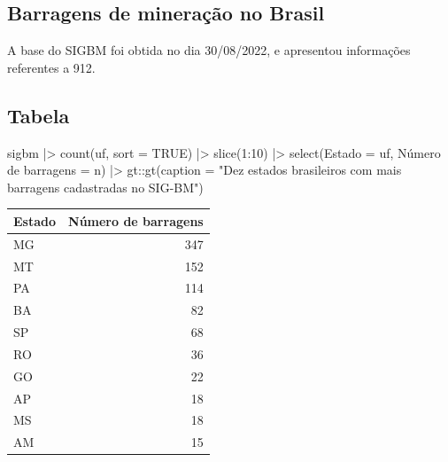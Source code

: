 \documentclass[
  letterpaper,
  DIV=11,
  numbers=noendperiod]{scrartcl}
\newenvironment{Shaded}{\begin{snugshade}}{\end{snugshade}}
\newcommand{\AttributeTok}[1]{\textcolor[rgb]{0.40,0.45,0.13}{#1}}
\newcommand{\ConstantTok}[1]{\textcolor[rgb]{0.56,0.35,0.01}{#1}}
\newcommand{\DecValTok}[1]{\textcolor[rgb]{0.68,0.00,0.00}{#1}}
\newcommand{\FunctionTok}[1]{\textcolor[rgb]{0.28,0.35,0.67}{#1}}
\newcommand{\NormalTok}[1]{\textcolor[rgb]{0.00,0.23,0.31}{#1}}
\newcommand{\OtherTok}[1]{\textcolor[rgb]{0.00,0.23,0.31}{#1}}
\newcommand{\SpecialCharTok}[1]{\textcolor[rgb]{0.37,0.37,0.37}{#1}}
\newcommand{\StringTok}[1]{\textcolor[rgb]{0.13,0.47,0.30}{#1}}
\begin{document}
\hypertarget{barragens-de-minerauxe7uxe3o-no-brasil}{%
\subsection{Barragens de mineração no
Brasil}\label{barragens-de-minerauxe7uxe3o-no-brasil}}

A base do SIGBM foi obtida no dia 30/08/2022, e apresentou informações
referentes a 912.

\hypertarget{tabela}{%
\subsection{Tabela}\label{tabela}}

\begin{Shaded}
\begin{Highlighting}[]
\NormalTok{sigbm }\SpecialCharTok{|\textgreater{}}
  \FunctionTok{count}\NormalTok{(uf, }\AttributeTok{sort =} \ConstantTok{TRUE}\NormalTok{) }\SpecialCharTok{|\textgreater{}}
  \FunctionTok{slice}\NormalTok{(}\DecValTok{1}\SpecialCharTok{:}\DecValTok{10}\NormalTok{) }\SpecialCharTok{|\textgreater{}}
  \FunctionTok{select}\NormalTok{(}\StringTok{\textasciigrave{}}\AttributeTok{Estado}\StringTok{\textasciigrave{}} \OtherTok{=}\NormalTok{ uf, }\StringTok{\textasciigrave{}}\AttributeTok{Número de barragens}\StringTok{\textasciigrave{}} \OtherTok{=}\NormalTok{ n) }\SpecialCharTok{|\textgreater{}}
\NormalTok{  gt}\SpecialCharTok{::}\FunctionTok{gt}\NormalTok{(}\AttributeTok{caption =} \StringTok{"Dez estados brasileiros com mais barragens cadastradas no SIG{-}BM"}\NormalTok{)}
\end{Highlighting}
\end{Shaded}

\captionsetup[table]{labelformat=empty,skip=1pt}
\begin{longtable}{lr}
\toprule
Estado & Número de barragens \\ 
\midrule
MG & 347 \\ 
MT & 152 \\ 
PA & 114 \\ 
BA & 82 \\ 
SP & 68 \\ 
RO & 36 \\ 
GO & 22 \\ 
AP & 18 \\ 
MS & 18 \\ 
AM & 15 \\ 
\bottomrule
\end{longtable}
\end{document}

